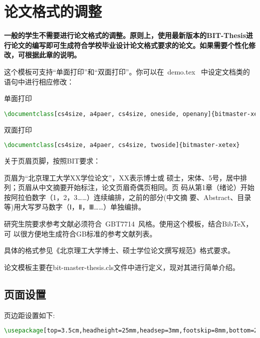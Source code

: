 

\chapter{论文格式的调整}
\label{sec:thesisformat}

\textbf{一般的学生不需要进行论文格式的调整。原则上，使用最新版本的BIT-Thesis进行论文的编写即可生成符合学校毕业设计论文格式要求的论文。如果需要个性化修改，可根据此章的说明。
}

这个模板可支持``单面打印''和``双面打印''。你可以在~demo.tex~
中设定文档类的语句中进行相应修改：

单面打印
\begin{lstlisting}[language={TeX}]
\documentclass[cs4size, a4paer, cs4size, oneside, openany]{bitmaster-xetex}

\end{lstlisting}

双面打印
\begin{lstlisting}[language={TeX}]
\documentclass[cs4size, a4paer, cs4size, twoside]{bitmaster-xetex}

\end{lstlisting}

关于页眉页脚，按照BIT要求：

页眉为``北京理工大学XX学位论文''，XX表示博士或
硕士，宋体、5号，居中排列；页眉从中文摘要开始标注，论文页眉奇偶页相同。页
码从第1章（绪论）开始按阿拉伯数字（1，2，3……）连续编排，之前的部分(中文摘
要、Abstract、目录等)用大写罗马数字（Ⅰ，Ⅱ，Ⅲ……）单独编排。

研究生院要求参考文献必须符合~GBT7714~风格。使用这个模板，结合BibTeX，可
以很方便地生成符合GB标准的参考文献列表。

具体的格式参见《北京理工大学博士、硕士学位论文撰写规范》格式要求。

论文模板主要在bit-master-thesis.cls文件中进行定义，现对其进行简单介绍。
\section{页面设置}
页边距设置如下:
\begin{lstlisting}[language={TeX}]
\usepackage[top=3.5cm,headheight=25mm,headsep=3mm,footskip=8mm,bottom=2.5cm,left=2.7cm,right=2.7cm]{geometry}

\end{lstlisting}

